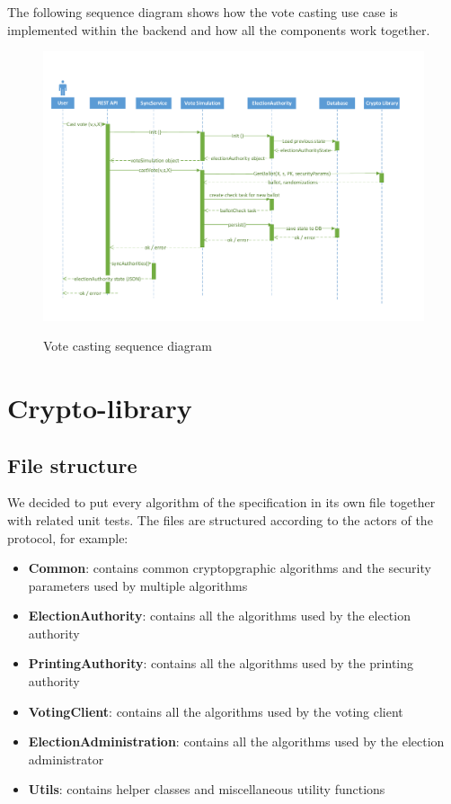 The following sequence diagram shows how the vote casting use case is implemented within the backend and how all the components work together.
\begin{figure}[h!]
\begin{center}
\includegraphics[scale=0.65]{assets/votecastingDiagram.pdf}\\
\caption{Vote casting sequence diagram}
\end{center}
\end{figure}

\section{Crypto-library}

\subsection{File structure}
We decided to put every algorithm of the specification in its own file together with related unit tests. The files are structured according to the actors of the protocol, for example:

\begin{itemize}
	\item \textbf{Common}: contains common cryptopgraphic algorithms and the security parameters used by multiple algorithms
	\item \textbf{ElectionAuthority}: contains all the algorithms used by the election authority
	\item \textbf{PrintingAuthority}: contains all the algorithms used by the printing authority
	\item \textbf{VotingClient}: contains all the algorithms used by the voting client
	\item \textbf{ElectionAdministration}: contains all the algorithms used by the election administrator
	\item \textbf{Utils}: contains helper classes and miscellaneous utility functions
\end{itemize}

